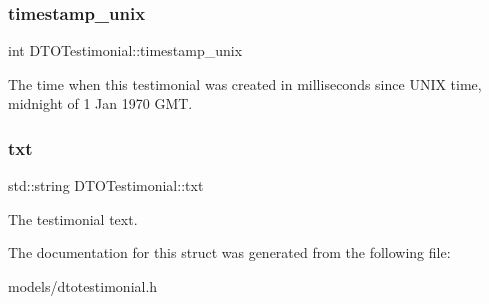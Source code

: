 \subsubsection{\texorpdfstring{timestamp\_unix}{timestamp\_unix}}
{\footnotesize\ttfamily int D\+T\+O\+Testimonial\+::timestamp\+\_\+unix}

The time when this testimonial was created in milliseconds since U\+N\+IX time, midnight of 1 Jan 1970 G\+MT. \mbox{\label{struct_d_t_o_testimonial_a2fe975367ddcb0e51ff4834ecf40a503}} 
\subsubsection{\texorpdfstring{txt}{txt}}
{\footnotesize\ttfamily std\+::string D\+T\+O\+Testimonial\+::txt}

The testimonial text. 

The documentation for this struct was generated from the following file\+:\begin{DoxyCompactItemize}
\item 
models/dtotestimonial.\+h\end{DoxyCompactItemize}
